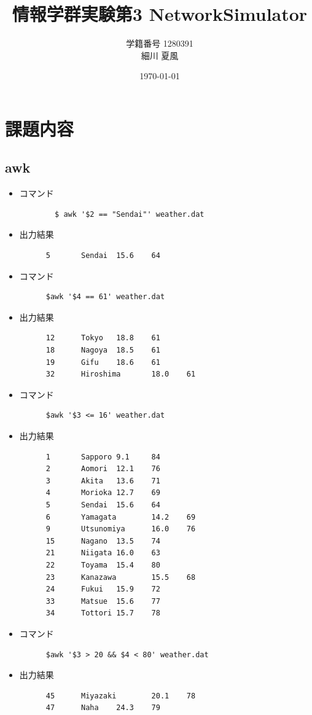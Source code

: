 \documentclass[paper=a4, fontsize=10pt]{jlreq}
\title{情報学群実験第3 NetworkSimulator}
\author{学籍番号 1280391 \\ 細川 夏風}
\date{\today}
\begin{document}
\maketitle

\section{課題内容}
\subsection{awk}
\begin{itemize}
  \item コマンド
    \begin{lstlisting}
        $ awk '$2 == "Sendai"' weather.dat
    \end{lstlisting}

  \item 出力結果
    \begin{lstlisting}
      5       Sendai  15.6    64 
    \end{lstlisting}

  \item コマンド
    \begin{lstlisting}
      $awk '$4 == 61' weather.dat
    \end{lstlisting}

  \item 出力結果
    \begin{lstlisting}
      12      Tokyo   18.8    61
      18      Nagoya  18.5    61
      19      Gifu    18.6    61
      32      Hiroshima       18.0    61
    \end{lstlisting}

  \item コマンド
    \begin{lstlisting}
      $awk '$3 <= 16' weather.dat
    \end{lstlisting}

  \item 出力結果
    \begin{lstlisting}
      1       Sapporo 9.1     84
      2       Aomori  12.1    76
      3       Akita   13.6    71
      4       Morioka 12.7    69
      5       Sendai  15.6    64
      6       Yamagata        14.2    69
      9       Utsunomiya      16.0    76
      15      Nagano  13.5    74
      21      Niigata 16.0    63
      22      Toyama  15.4    80
      23      Kanazawa        15.5    68
      24      Fukui   15.9    72
      33      Matsue  15.6    77
      34      Tottori 15.7    78
    \end{lstlisting}

  \item コマンド
    \begin{lstlisting}
      $awk '$3 > 20 && $4 < 80' weather.dat
    \end{lstlisting}

  \item 出力結果
    \begin{lstlisting}
      45      Miyazaki        20.1    78
      47      Naha    24.3    79
    \end{lstlisting}
\end{itemize}
\end{document}
